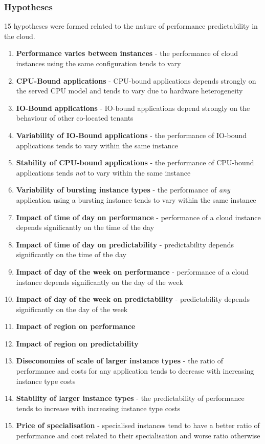 \documentclass{sty/SizheArticle}
\begin{document}
\subsubsection{Hypotheses}
15 hypotheses were formed related to the nature of performance predictability
in the cloud.
\begin{enumerate}
\item \textbf{Performance varies between instances} - the performance of cloud
instances using the same configuration tends to vary
\item \textbf{CPU-Bound applications} - CPU-bound applications depends strongly
on the served CPU model and tends to vary due to hardware heterogeneity
\item \textbf{IO-Bound applications} - IO-bound applications depend strongly on
the behaviour of other co-located tenants
\item \textbf{Variability of IO-Bound applications} - the performance of IO-bound
applications tends to vary within the same instance
\item \textbf{Stability of CPU-bound applications} - the performance of CPU-bound
applications tends \textit{not} to vary within the same instance
\item \textbf{Variability of bursting instance types} - the performance of
\textit{any} application using a bursting instance tends to vary within the
same instance
\item \textbf{Impact of time of day on performance} - performance of a cloud
instance depends significantly on the time of the day
\item \textbf{Impact of time of day on predictability} - predictability depends
significantly on the time of the day
\item \textbf{Impact of day of the week on performance} - performance of a cloud
instance depends significantly on the day of the week
\item \textbf{Impact of day of the week on predictability} - predictability
depends significantly on the day of the week
\item \textbf{Impact of region on performance}
\item \textbf{Impact of region on predictability}
\item \textbf{Diseconomies of scale of larger instance types} - the ratio of
performance and costs for any application tends to decrease with increasing
instance type costs
\item \textbf{Stability of larger instance types} - the predictability of
performance tends to increase with increasing instance type costs
\item \textbf{Price of specialisation} - specialised instances tend to have a
better ratio of performance and cost related to their specialisation and
worse ratio otherwise
\end{enumerate}
\end{document}
